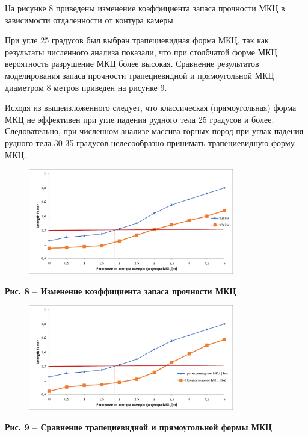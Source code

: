 На рисунке 8 приведены изменение коэффициента запаса прочности МКЦ в
зависимости отдаленности от контура камеры.

При угле 25 градусов был выбран трапециевидная форма МКЦ, так как
результаты численного анализа показали, что при столбчатой форме МКЦ
вероятность разрушение МКЦ более высокая. Сравнение результатов
моделирования запаса прочности трапециевидной и прямоугольной МКЦ
диаметром 8 метров приведен на рисунке 9.

Исходя из вышеизложенного следует, что классическая (прямоугольная)
форма МКЦ не эффективен при угле падения рудного тела 25 градусов и
более. Следовательно, при численном анализе массива горных пород при
углах падения рудного тела 30-35 градусов целесообразно принимать
трапециевидную форму МКЦ.

\begin{figure}[H]
	\centering
	\includegraphics[width=0.8\textwidth]{assets/288}
	\caption*{}
\end{figure}

{\bfseries Рис. 8 -- Изменение коэффициента запаса прочности МКЦ}

\begin{figure}[H]
	\centering
	\includegraphics[width=0.8\textwidth]{assets/289}
	\caption*{}
\end{figure}

{\bfseries Рис. 9 -- Сравнение трапециевидной и прямоугольной формы МКЦ}


